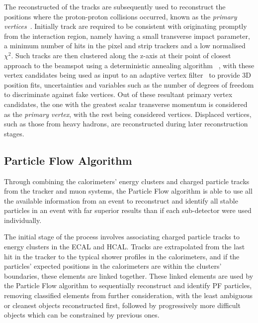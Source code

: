 {%
The reconstructed of the tracks are subsequently used to reconstruct the positions where the proton-proton collisions occurred, known as the \emph{primary vertices}~\cite{Speer:2006mh,Chatrchyan:2014fea}.
Initially track are required to be consistent with originating promptly from the interaction region, namely having a small transverse impact parameter, a minimum number of hits in the pixel and strip trackers and a low normalised $\chi^{2}$.
Such tracks are then clustered along the z-axis at their point of closest approach to the beamspot using a deterministic annealing algorithm	~\cite{Kenneth:1998i}, with these vertex candidates being used as input to an adaptive vertex filter~\cite{Fruhwirth:2007hz} to provide 3D position fits, uncertainties and variables such as the number of degrees of freedom to discriminate against fake vertices.
Out of these resultant primary vertex candidates, the one with the greatest scalar transverse momentum is considered as the \emph{primary vertex}, with the rest being considered \PU vertices.
Displaced vertices, such as those from heavy hadrons, are reconstructed during later reconstruction stages.

\subsection{Particle Flow Algorithm}\label{subsec:PF}
Through combining the calorimeters' energy clusters and charged particle tracks from the tracker and muon systems, the Particle Flow algorithm is able to use all the available information from an event to reconstruct and identify all stable particles in an event with far superior results than if each sub-detector were used individually.

The initial stage of the process involves associating charged particle tracks to energy clusters in the ECAL and HCAL.
Tracks are extrapolated from the last hit in the tracker to the typical shower profiles in the calorimeters, and if the particles' expected positions in the calorimeters are within the clusters' boundaries, these elements are linked together.
These linked elements are used by the Particle Flow algorithm to sequentially reconstruct and identify PF particles, removing classified elements from further consideration, with the least ambiguous or cleanest objects reconstructed first, followed by progressively more difficult objects which can be constrained by previous ones.

}
